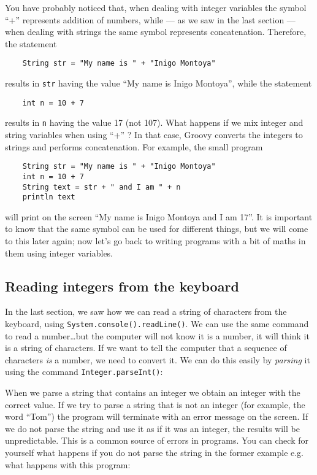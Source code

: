 You have probably noticed that, when dealing with integer
variables the symbol ``+'' represents addition of numbers, while --- as
we saw in the last section --- when dealing with strings the same
symbol represents concatenation. Therefore, the statement

\begin{Verbatim}
    String str = "My name is " + "Inigo Montoya"
\end{Verbatim}

results in \verb+str+ having the value ``My name is Inigo Montoya'',
while the statement

\begin{Verbatim}
    int n = 10 + 7
\end{Verbatim}

results in \verb+n+ having the value 17 (not 107). What happens if we
mix integer and string variables when using ``+'' ? 
In that case, Groovy converts the integers to strings and performs
concatenation. For example, the small program

\begin{Verbatim}
    String str = "My name is " + "Inigo Montoya"
    int n = 10 + 7
    String text = str + " and I am " + n
    println text
\end{Verbatim}

will print on the screen ``My name is Inigo Montoya and I am 17''. It
is important to know that the same symbol can be used for different
things, but we will come to this later again; now let's go back to
writing programs with a bit of maths in them using integer variables.

\subsection{Reading integers from the keyboard}
\label{sec:intkeyboard}

In the last section, we saw how we can read a string of characters
from the keyboard, 
using \verb+System.console().readLine()+. We can use the same command
to read a number\ldots but the computer will not know it is a number,
it will think it is a string of characters. If we want to tell the
computer that a sequence of characters \emph{is} a number, we need to convert it. 
We can do this easily by \emph{parsing} it using the command
\verb+Integer.parseInt()+: 


When we parse a string that contains an integer we obtain an integer
with the correct value. If we try to parse a string that is not an
integer (for example, the word ``Tom'') the program will terminate with an error
message on the screen. If we do not parse the string and use it as if
it was an integer, the results will be unpredictable. This
is a common source of errors in programs. You can check for yourself
what happens if you do not parse the string in the former example e.g.
what happens with this program:

